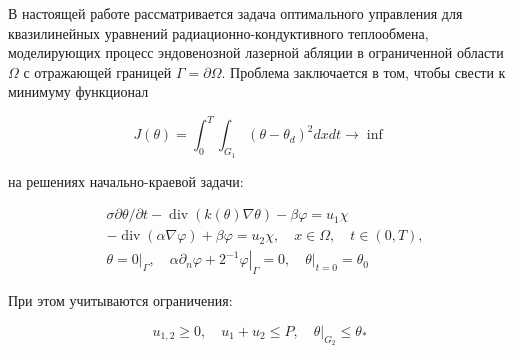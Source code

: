 %


В настоящей работе рассматривается задача оптимального управления для квазилинейных
уравнений радиационно-кондуктивного теплообмена, моделирующих процесс эндовенозной
лазерной абляции в ограниченной области $\Omega$ с отражающей границей $\Gamma=\partial\Omega$.
Проблема заключается в том, чтобы свести к минимуму функционал

\[ J(\theta)=\int_{0}^{T} \int_{G_{1}}\left(\theta-\theta_{d}\right)^{2} d x d t \rightarrow \inf \]

на решениях начально-краевой задачи:

\[
    \begin{aligned}
        &\sigma \partial \theta / \partial t-\operatorname{div}(k(\theta)
        \nabla \theta)-\beta \varphi=u_{1} \chi \\
        &-\operatorname{div}(\alpha \nabla \varphi)+\beta \varphi=u_{2}
        \chi, \quad x \in \Omega, \quad t \in(0, T), \\
        &\theta=\left.0\right|_{\Gamma}, \quad \alpha \partial_{n}
        \varphi+\left.2^{-1} \varphi\right|_{\Gamma}=0,\left.\quad \theta\right|_{t=0}=\theta_{0}
    \end{aligned}
\]

При этом учитываются ограничения:

\[
    u_{1,2} \geq 0, \quad u_{1}+u_{2} \leq P,\left.\quad \theta\right|_{G_{2}} \leq \theta_{*}
\]

